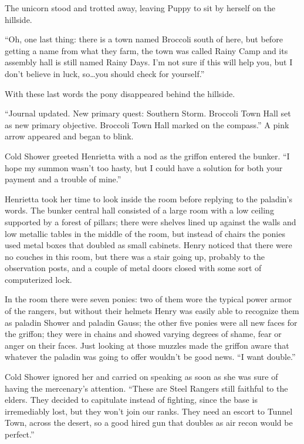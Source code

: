 The unicorn stood and trotted away, leaving Puppy to sit by herself on the hillside.

``Oh, one last thing: there is a town named Broccoli south of here, but before getting a name from what they farm, the town was called Rainy Camp and its assembly hall is still named Rainy Days. I'm not sure if this will help you, but I don't believe in luck, so\dots you should check for yourself.''

With these last words the pony disappeared behind the hillside.

``{\rt Journal updated. New primary quest: Southern Storm. Broccoli Town Hall set as new primary objective. Broccoli Town Hall marked on the compass.}'' A pink arrow appeared and began to blink.

\horizonline


Cold Shower greeted Henrietta with a nod as the griffon entered the bunker. ``I hope my summon wasn't too hasty, but I could have a solution for both your payment and a trouble of mine.''

Henrietta took her time to look inside the room before replying to the paladin's words. The bunker central hall consisted of a large room with a low ceiling supported by a forest of pillars; there were shelves lined up against the walls and low metallic tables in the middle of the room, but instead of chairs the ponies used metal boxes that doubled as small cabinets. Henry noticed that there were no couches in this room, but there was a stair going up, probably to the observation posts, and a couple of metal doors closed with some sort of computerized lock.

In the room there were seven ponies: two of them wore the typical power armor of the rangers, but without their helmets Henry was easily able to recognize them as paladin Shower and paladin Gauss; the other five ponies were all new faces for the griffon; they were in chains and showed varying degrees of shame, fear or anger on their faces. Just looking at those muzzles made the griffon aware that whatever the paladin was going to offer wouldn't be good news. ``I want double.''

Cold Shower ignored her and carried on speaking as soon as she was sure of having the mercenary's attention. ``These are Steel Rangers still faithful to the elders. They decided to capitulate instead of fighting, since the base is irremediably lost, but they won't join our ranks. They need an escort to Tunnel Town, across the desert, so a good hired gun that doubles as air recon would be perfect.''

